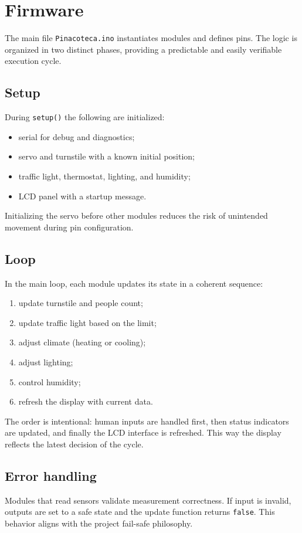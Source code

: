 \chapter{Firmware}

The main file \texttt{Pinacoteca.ino} instantiates modules and defines pins. The logic is organized in two distinct phases, providing a predictable and easily verifiable execution cycle.

\section{Setup}
During \texttt{setup()} the following are initialized:
\begin{itemize}
  \item serial for debug and diagnostics;
  \item servo and turnstile with a known initial position;
  \item traffic light, thermostat, lighting, and humidity;
  \item LCD panel with a startup message.
\end{itemize}
Initializing the servo before other modules reduces the risk of unintended movement during pin configuration.

\section{Loop}
In the main loop, each module updates its state in a coherent sequence:
\begin{enumerate}
  \item update turnstile and people count;
  \item update traffic light based on the limit;
  \item adjust climate (heating or cooling);
  \item adjust lighting;
  \item control humidity;
  \item refresh the display with current data.
\end{enumerate}
The order is intentional: human inputs are handled first, then status indicators are updated, and finally the LCD interface is refreshed. This way the display reflects the latest decision of the cycle.

\section{Error handling}
Modules that read sensors validate measurement correctness. If input is invalid, outputs are set to a safe state and the update function returns \texttt{false}. This behavior aligns with the project fail-safe philosophy.

